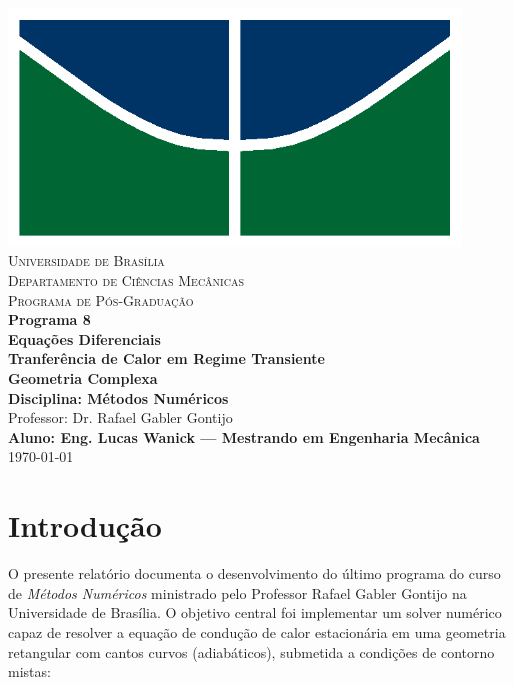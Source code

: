 \documentclass[12pt]{article}
\begin{document}
\begin{titlepage}
    \centering
    \includegraphics[width=12cm]{img/unb_bandeira.png} \\
    \vspace{1cm}
    \textsc{\Large Universidade de Bras\'ilia} \\
    \textsc{Departamento de Ciências Mec\^anicas} \\
    \textsc{Programa de P\'os-Gradua\c{c}\~ao} \\
    \vfill
    {\Large\bfseries Programa 8} \\
    \vspace{0.5cm}
    {\Large\bfseries Equações Diferenciais} \\
    {\Large\bfseries Tranferência de Calor em Regime Transiente} \\
    {\Large\bfseries Geometria Complexa} \\
    \vspace{0.5cm}
    \textbf{Disciplina: M\'etodos Num\'ericos} \\
    Professor: Dr. Rafael Gabler Gontijo \\
    \vfill
    \textbf{Aluno: Eng. Lucas Wanick — Mestrando em Engenharia Mec\^anica} \\
    \vspace{0.5cm}
        \today \\
\end{titlepage}


\section{Introdução}
O presente relatório documenta o desenvolvimento do último programa do curso de \textit{Métodos Numéricos} ministrado pelo Professor Rafael Gabler Gontijo na Universidade de Brasília.  
O objetivo central foi implementar um solver numérico capaz de resolver a equação de condução de calor estacionária em uma geometria retangular com cantos curvos (adiabáticos), submetida a condições de contorno mistas:
\end{document}

